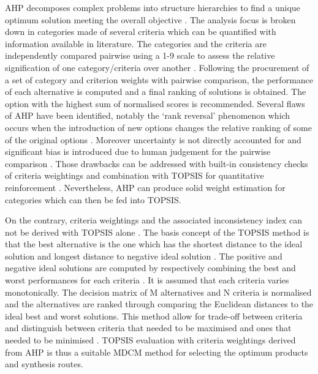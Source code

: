 AHP decomposes complex problems into structure hierarchies to find a unique optimum solution meeting the overall objective \cite{mu_practical_2017}. The analysis focus is broken down in categories made of several criteria which can be quantified with information available in literature. The categories and the criteria are independently compared pairwise using a 1-9 scale to assess the relative signification of one category/criteria over another \cite{saaty_analytic_1987}. Following the procurement of a set of category and criterion weights with pairwise comparison, the performance of each alternative is computed and a final ranking of solutions is obtained. The option with the highest sum of normalised scores is recommended. Several flaws of AHP have been identified, notably the ‘rank reversal’ phenomenon which occurs when the introduction of new options changes the relative ranking of some of the original options \cite{great_britain_multi-criteria_2009}. Moreover uncertainty is not directly accounted for and significant bias is introduced due to human judgement for the pairwise comparison \cite{millet_modelling_2002}. Those drawbacks can be addressed with built-in consistency checks of criteria weightings and combination with TOPSIS for quantitative reinforcement \cite{tzeng_multi-criteria_2005}. Nevertheless, AHP can produce solid weight estimation for categories which can then be fed into TOPSIS. 

On the contrary, criteria weightings and the associated inconsistency index can not be derived with TOPSIS alone \cite{roszkowska_multi-criteria_2011}. The basis concept of the TOPSIS method is that the best alternative is the one which has the shortest distance to the ideal solution and longest distance to negative ideal solution \cite{pohekar_application_2004}. The positive and negative ideal solutions are computed by respectively combining the best and worst performances for each criteria \cite{olson_comparison_2004}. It is assumed that each criteria varies monotonically. The decision matrix of M alternatives and N criteria is normalised and the alternatives are ranked through comparing the Euclidean distances to the ideal best and worst solutions. This method allow for trade-off between criteria and distinguish between criteria that needed to be maximised and ones that needed to be minimised \cite{pirdashti_multi-criteria_2009}. TOPSIS evaluation with criteria weightings derived from AHP is thus a suitable MDCM method for selecting the optimum products and synthesis routes.



